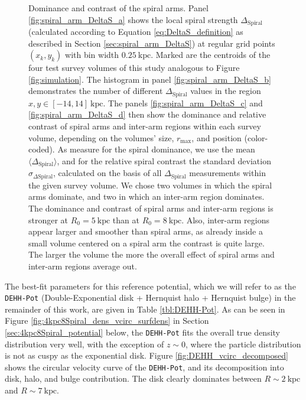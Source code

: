 \documentclass[iop,revtex4,numberedappendix,appendixfloats]{emulateapj}
\begin{document}
\begin{figure}[!htbp]
\caption{Dominance and contrast of the spiral arms. Panel \ref{fig:spiral_arm_DeltaS_a} shows the local spiral strength $\Delta_{\text{Spiral}}$ (calculated according to Equation \eqref{eq:DeltaS_definition} as described in Section \ref{sec:spiral_arm_DeltaS}) at regular grid points $(x_k,y_k)$ with bin width $0.25~\text{kpc}$. Marked are the centroids of the four test survey volumes of this study analogous to Figure \ref{fig:simulation}. The histogram in panel \ref{fig:spiral_arm_DeltaS_b} demonstrates the number of different $\Delta_\text{Spiral}$ values in the region $x,y \in [-14,14]~\text{kpc}$. The panels \ref{fig:spiral_arm_DeltaS_c} and \ref{fig:spiral_arm_DeltaS_d} then show the dominance and relative contrast of spiral arms and inter-arm regions within each survey volume, depending on the volumes' size, $r_\text{max}$, and position (color-coded). As measure for the spiral dominance, we use the mean $\langle \Delta_\text{Spiral} \rangle$, and for the relative spiral contrast the standard deviation $\sigma_{\Delta\text{Spiral}}$, calculated on the basis of all $\Delta_{\text{Spiral}}$ measurements within the given survey volume. We chose two volumes in which the spiral arms dominate, and two in which an inter-arm region dominates. The dominance and contrast of spiral arms and inter-arm regions is stronger at $R_0=5~\text{kpc}$ than at $R_0=8~\text{kpc}$. Also, inter-arm regions appear larger and smoother than spiral arms, as already inside a small volume centered on a spiral arm the contrast is quite large. The larger the volume the more the overall effect of spiral arms and inter-arm regions average out.}
\label{fig:spiral_arm_DeltaS}
\end{figure}

The best-fit parameters for this reference potential, which we will refer to as the \texttt{DEHH-Pot} (Double-Exponential disk + Hernquist halo + Hernquist bulge) in the remainder of this work, are given in Table \ref{tbl:DEHH-Pot}. As can be seen in Figure \ref{fig:4kpc8Spiral_dens_vcirc_surfdens} in Section \ref{sec:4kpc8Spiral_potential} below, the \texttt{DEHH-Pot} fits the overall true density distribution very well, with the exception of $z\sim0$, where the particle distribution is not as cuspy as the exponential disk. Figure \ref{fig:DEHH_vcirc_decomposed} shows the circular velocity curve of the \texttt{DEHH-Pot}, and its decomposition into disk, halo, and bulge contribution. The disk clearly dominates between $R\sim2~\text{kpc}$ and $R\sim7~\text{kpc}$.
\end{document}
